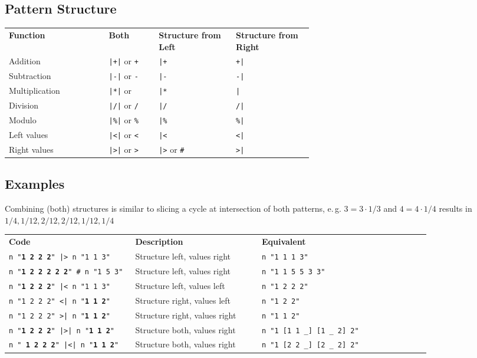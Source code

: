 \documentclass[8pt]{extarticle} %
\begin{document}
\begin{multicols}{2}
		\section{Pattern Structure}
		{\small
		\begin{tabular}{L{0.2\linewidth} L{0.1\linewidth} C{0.15\linewidth} C{0.15\linewidth}}
			\small\bf Function & \small\bf Both & \small\bf Structure from Left & \small\bf Structure from Right \\ 
			Addition  & {\tt |+|} or {\tt +}  &\tt |+ & \tt +| \\
			Subtraction  & {\tt |-|} or {\tt -}  &\tt |- & \tt -| \\
			Multiplication  & {\tt |*|} or {\tt *}  &\tt |* & \tt *| \\
			Division  & {\tt |/|} or {\tt /}  &\tt |/ & \tt /| \\
			Modulo  & {\tt |\%|} or {\tt \%}  &\tt |\% & \tt \%| \\
			Left values  & {\tt |<|} or {\tt <}  &\tt |< & \tt <| \\
			Right values  & {\tt |>|} or {\tt >}  & {\tt |>} or {\tt \#} & \tt >|
		\end{tabular}
	 	}
  	
  		\vspace{5pt}
  
 		\subsection{Examples}
 		Combining (both) structures is similar to slicing a cycle at intersection of both patterns, e.\,g. $3 = 3 \cdot 1/3$ and $4 = 4 \cdot 1/4$ results in $1/4, 1/12, 2/12, 2/12, 1/12, 1/4$\\ \vspace{5pt}
		{\small
		\begin{tabular}{L{0.3\linewidth} L{0.3\linewidth} L{0.45\linewidth} }
			\small\bf Code & \small\bf Description & \small\bf Equivalent \\ 
			\tt n "{\bf 1 2 2 2}" |> n "{\color{blue}1 1 3}" & Structure left, values right & {\tt n "1 1 1 3"} \\
			\tt n "{\bf 1 2 2 2 2 2}" \# n "{\color{blue}1 5 3}" & Structure left, values right & \tt n "1 1 5 5 3 3" \\
			\tt n "{\bf\color{blue}1 2 2 2}" |< n "1 1 3" & Structure left, values left & {\tt n "1 2 2 2"}  \\
			\tt n "{\color{blue}1 2 2} 2" <| n "{\bf1 1 2}" & Structure right, values left & \tt n "1 2 2" \\
			\tt n "1 2 2 2" >| n "{\bf\color{blue}1 1 2}" & Structure right, values right & \tt n "1 1 2"\\
			\tt n "{\bf 1 2 2 2}" |>| n "{\bf\color{blue}1 1 2}" & Structure both, values right & \tt n "1 [1 1 \_] [1 \_ 2] 2" \\
			\tt n "{\bf\color{blue} 1 2 2 2}" |<| n "{\bf1 1 2}" & Structure both, values right & \tt n "1 [2 2 \_] [2 \_ 2] 2"
		\end{tabular}
		}


\end{multicols}
\end{document}
